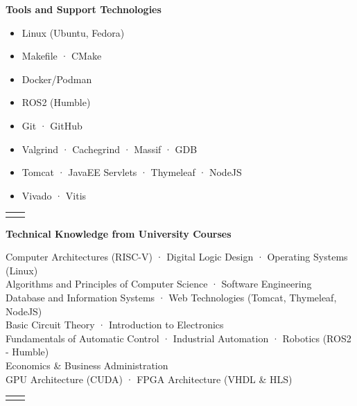 \documentclass[a4paper, 10pt]{article}
\makeatletter
\newenvironment{cvsubsection}[2]{

    \vspace{0.5cm} \par \noindent
    \begin{minipage}{\textwidth}

        \colorbox{#1}{

            \parbox{\textwidth}{\textbf{#2}}
                        
        }
        \begin{lrbox}{\cvsubbox}

            \begin{minipage}{\dimexpr \textwidth - 0.5em \relax}

}{
    
            \end{minipage}

        \end{lrbox} \par \noindent
        \begin{tabular}{ @{} p{0.5em} | p{\dimexpr \textwidth - 0.5em \relax} @{} }
            
            &   \usebox{\cvsubbox} \\
            
        \end{tabular}
        
    \end{minipage} \par

}
\makeatother
\begin{document}
        \begin{cvsubsection}{blue!20}{Tools and Support Technologies}

            \begin{minipage}[t]{0.3\textwidth}
                \begin{itemize}
                    \item Linux (Ubuntu, Fedora)
                    \item Makefile · CMake
                    \item Docker/Podman
                    \item ROS2 (Humble)
                \end{itemize}
            \end{minipage}
            \hspace{1 cm}
            \begin{minipage}[t]{0.525\textwidth}
                \begin{itemize}
                    \item Git · GitHub
                    \item Valgrind · Cachegrind · Massif · GDB
                    \item Tomcat · JavaEE Servlets · Thymeleaf · NodeJS
                    \item Vivado · Vitis
                \end{itemize}
            \end{minipage}

        \end{cvsubsection}
        
        \begin{cvsubsection}{blue!20}{Technical Knowledge from University Courses}
    
            Computer Architectures (RISC-V) · Digital Logic Design · Operating Systems (Linux) \\[0.2 em]
            Algorithms and Principles of Computer Science · Software Engineering \\[0.2 em]
            Database and Information Systems · Web Technologies (Tomcat, Thymeleaf, NodeJS)\\[0.2 em]
            Basic Circuit Theory · Introduction to Electronics \\[0.2em]
            Fundamentals of Automatic Control · Industrial Automation · Robotics (ROS2 - Humble) \\[0.4 em]

            Economics \& Business Administration \\[0.4 em]

            GPU Architecture (CUDA) · FPGA Architecture (VHDL \& HLS) \\[0.2 em]
    
        \end{cvsubsection}
\end{document}
